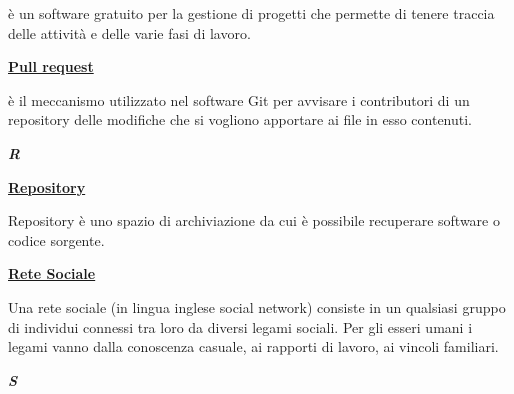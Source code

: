 \medskip
\begin{addmargin}[5em]{1em}	
è un software gratuito per la gestione di progetti che permette di tenere traccia delle attività e delle varie fasi di lavoro.
\end{addmargin}

\bigskip
\begin{addmargin}[0em]{0em}
	\textbf{\underline{Pull request}} 
\end{addmargin}
	
\medskip
\begin{addmargin}[5em]{1em}
è il meccanismo utilizzato nel software Git per avvisare i contributori di un repository delle modifiche che si vogliono apportare ai file in esso contenuti.	
\end{addmargin}	

\newpage
	
\cleardoublepage
{}
{}
\noindent\hrulefill\hspace{4mm}\textbf{\textsl{\Huge{R}}}\hspace{4mm}\hrulefill

\vspace*{2\bigskipamount}

\bigskip
\begin{addmargin}[0em]{0em}	
	\textbf{\underline{Repository}}
\end{addmargin} 

\medskip
\begin{addmargin}[5em]{1em}
Repository è uno spazio di archiviazione da cui è possibile recuperare software o codice sorgente.
\end{addmargin}	

\bigskip
\begin{addmargin}[0em]{0em}	
	\textbf{\underline{Rete Sociale}} 
\end{addmargin}
	
\medskip
\begin{addmargin}[5em]{1em}
Una rete sociale (in lingua inglese social network) consiste in un qualsiasi gruppo di individui connessi tra loro da diversi legami sociali. Per gli esseri umani i legami vanno dalla conoscenza casuale, ai rapporti di lavoro, ai vincoli familiari.
\end{addmargin}	
	
\newpage
	
\cleardoublepage
{}
{}
\noindent\hrulefill\hspace{4mm}\textbf{\textsl{\Huge{S}}}\hspace{4mm}\hrulefill

